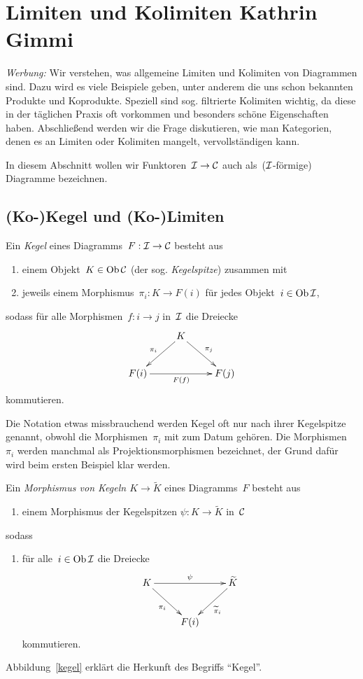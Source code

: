 \section[Limiten und Kolimiten]{Limiten und Kolimiten \hfill \small
Kathrin Gimmi}

\emph{Werbung:} Wir verstehen, was allgemeine Limiten und Kolimiten von
Diagrammen sind. Dazu wird es viele Beispiele geben, unter anderem die uns
schon bekannten Produkte und Koprodukte. Speziell sind sog. filtrierte
Kolimiten wichtig, da diese in der täglichen Praxis oft vorkommen und besonders
schöne Eigenschaften haben. Abschließend werden wir die Frage diskutieren, wie
man Kategorien, denen es an Limiten oder Kolimiten mangelt, vervollständigen
kann.

In diesem Abschnitt wollen wir Funktoren~$\mathcal{I} \to \mathcal{C}$ auch als~($\mathcal{I}$-förmige)
Diagramme bezeichnen.


\subsection{(Ko-)Kegel und (Ko-)Limiten}

\begin{defn}Ein \emph{Kegel} eines Diagramms~$F : \mathcal{I} \to \mathcal{C}$ besteht aus
\begin{enumerate}
\item einem Objekt~$K \in \operatorname{Ob} \mathcal{C}$ (der sog. \emph{Kegelspitze}) zusammen mit
\item jeweils einem Morphismus~$\pi_i : K \to F(i)$ für jedes Objekt~$i \in \operatorname{Ob}\mathcal{I}$,
\end{enumerate}
sodass
für alle Morphismen~$f : i \to j$ in~$\mathcal{I}$ die Dreiecke
\[ \xymatrix{
  & K \ar[ld]_{\pi_i} \ar[rd]^{\pi_j} \\
  F(i) \ar[rr]_{F(f)} && F(j)
} \]
kommutieren.
\end{defn}
Die Notation etwas missbrauchend werden Kegel oft nur nach ihrer Kegelspitze
genannt, obwohl die Morphismen~$\pi_i$ mit zum Datum gehören.
Die Morphismen~$\pi_i$ werden manchmal als Projektionsmorphismen
bezeichnet, der Grund dafür wird beim ersten Beispiel klar werden.

\begin{defn}Ein \emph{Morphismus von Kegeln $K \to \widetilde K$} eines Diagramms~$F$ besteht aus
\begin{enumerate}
\item[] einem Morphismus der Kegelspitzen $\psi : K \to \widetilde K$ in~$\mathcal{C}$
\end{enumerate}
sodass
\begin{enumerate}
\item[]
für alle~$i \in \operatorname{Ob}\mathcal{I}$ die Dreiecke
\[ \xymatrix{
  K \ar[rr]^{\psi} \ar[rd]_{\pi_i} && \widetilde K \ar[ld]^{\widetilde\pi_i} \\
  & F(i)
} \]
kommutieren.
\end{enumerate}
\end{defn}
Abbildung~\ref{kegel} erklärt die Herkunft des Begriffs "`Kegel"'.

